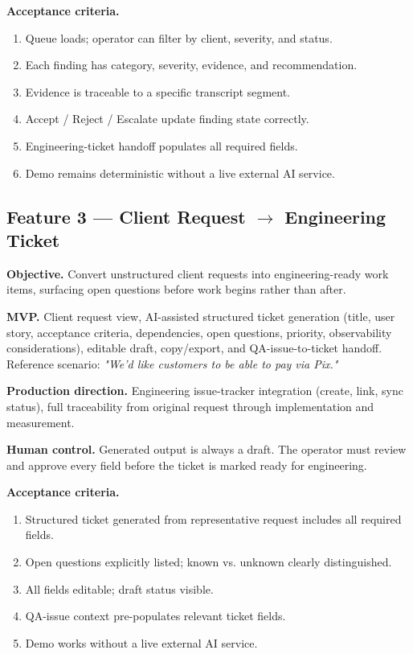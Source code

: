 \documentclass[11pt,a4paper]{article}
\begin{document}
\textbf{Acceptance criteria.}
\begin{enumerate}
  \item Queue loads; operator can filter by client, severity, and status.
  \item Each finding has category, severity, evidence, and recommendation.
  \item Evidence is traceable to a specific transcript segment.
  \item Accept / Reject / Escalate update finding state correctly.
  \item Engineering-ticket handoff populates all required fields.
  \item Demo remains deterministic without a live external AI service.
\end{enumerate}

\subsection{Feature 3 --- Client Request \texorpdfstring{$\rightarrow$}{->} Engineering Ticket}

\textbf{Objective.} Convert unstructured client requests into engineering-ready work items, surfacing open questions before work begins rather than after.

\textbf{MVP.} Client request view, AI-assisted structured ticket generation (title, user story, acceptance criteria, dependencies, open questions, priority, observability considerations), editable draft, copy/export, and QA-issue-to-ticket handoff. Reference scenario: \emph{"We'd like customers to be able to pay via Pix."}

\textbf{Production direction.} Engineering issue-tracker integration (create, link, sync status), full traceability from original request through implementation and measurement.

\textbf{Human control.} Generated output is always a draft. The operator must review and approve every field before the ticket is marked ready for engineering.

\textbf{Acceptance criteria.}
\begin{enumerate}
  \item Structured ticket generated from representative request includes all required fields.
  \item Open questions explicitly listed; known vs. unknown clearly distinguished.
  \item All fields editable; draft status visible.
  \item QA-issue context pre-populates relevant ticket fields.
  \item Demo works without a live external AI service.
\end{enumerate}
\end{document}
